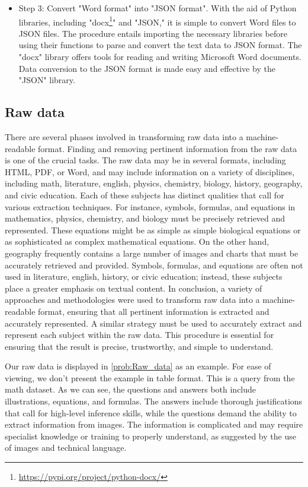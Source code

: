 \documentclass{article}
\begin{document}
{\begin{itemize}
		\item Step 3: Convert "Word format" into "JSON format". With the aid of Python libraries, including "docx\footnote{\href{https://pypi.org/project/python-docx/}{https://pypi.org/project/python-docx/}}" and "JSON," it is simple to convert Word files to JSON files. The procedure entails importing the necessary libraries before using their functions to parse and convert the text data to JSON format. The "docx" library offers tools for reading and writing Microsoft Word documents. Data conversion to the JSON format is made easy and effective by the "JSON" library. 
		
		
		
	\end{itemize}
	
	
	\subsection{Raw data}
	\label{sec:Raw data}
	
	There are several phases involved in transforming raw data into a machine-readable format. Finding and removing pertinent information from the raw data is one of the crucial tasks. The raw data may be in several formats, including HTML, PDF, or Word, and may include information on a variety of disciplines, including math, literature, english, physics, chemistry, biology, history, geography, and civic education. Each of these subjects has distinct qualities that call for various extraction techniques. For instance, symbols, formulas, and equations in mathematics, physics, chemistry, and biology must be precisely retrieved and represented. These equations might be as simple as simple biological equations or as sophisticated as complex mathematical equations. On the other hand, geography frequently contains a large number of images and charts that must be accurately retrieved and provided. Symbols, formulas, and equations are often not used in literature, english, history, or civic education; instead, these subjects place a greater emphasis on textual content. In conclusion, a variety of approaches and methodologies were used to transform raw data into a machine-readable format, ensuring that all pertinent information is extracted and accurately represented. A similar strategy must be used to accurately extract and represent each subject within the raw data. This procedure is essential for ensuring that the result is precise, trustworthy, and simple to understand.
	
	Our raw data is displayed in \ref{prob:Raw_data} as an example. For ease of viewing, we don't present the example in table format. This is a query from the math dataset. As we can see, the questions and answers both include illustrations, equations, and formulas. The answers include thorough justifications that call for high-level inference skills, while the questions demand the ability to extract information from images. The information is complicated and may require specialist knowledge or training to properly understand, as suggested by the use of images and technical language.
	
}
\end{document}
